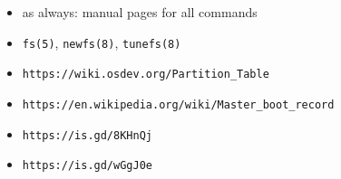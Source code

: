 \documentclass[xga]{xdvislides}
\begin{document}
\vspace{1in}
\begin{itemize}
	\item as always: manual pages for all commands
	\item {\tt fs(5)}, {\tt newfs(8)}, {\tt tunefs(8)}
	\item {\tt https://wiki.osdev.org/Partition\_Table}
	\item {\tt https://en.wikipedia.org/wiki/Master\_boot\_record}
	\item \verb+https://is.gd/8KHnQj+
	\item \verb+https://is.gd/wGgJ0e+
\end{itemize}


%
%
%
%
\end{document}
